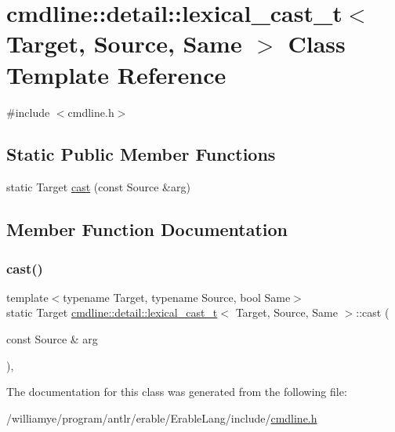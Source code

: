 \hypertarget{classcmdline_1_1detail_1_1lexical__cast__t}{}\section{cmdline\+::detail\+::lexical\+\_\+cast\+\_\+t$<$ Target, Source, Same $>$ Class Template Reference}
\label{classcmdline_1_1detail_1_1lexical__cast__t}


{\ttfamily \#include $<$cmdline.\+h$>$}

\subsection*{Static Public Member Functions}
\begin{DoxyCompactItemize}
\item 
static Target \mbox{\hyperlink{classcmdline_1_1detail_1_1lexical__cast__t_a533dd7d81255f684abba07d6c1545b1b}{cast}} (const Source \&arg)
\end{DoxyCompactItemize}


\subsection{Member Function Documentation}
\mbox{\label{classcmdline_1_1detail_1_1lexical__cast__t_a533dd7d81255f684abba07d6c1545b1b}} 
\subsubsection{\texorpdfstring{cast()}{cast()}}
{\footnotesize\ttfamily template$<$typename Target, typename Source, bool Same$>$ \\
static Target \mbox{\hyperlink{classcmdline_1_1detail_1_1lexical__cast__t}{cmdline\+::detail\+::lexical\+\_\+cast\+\_\+t}}$<$ Target, Source, Same $>$\+::cast (\begin{DoxyParamCaption}\item[{const Source \&}]{arg }\end{DoxyParamCaption})\hspace{0.3cm}{\ttfamily [inline]}, {\ttfamily [static]}}



The documentation for this class was generated from the following file\+:\begin{DoxyCompactItemize}
\item 
/williamye/program/antlr/erable/\+Erable\+Lang/include/\mbox{\hyperlink{cmdline_8h}{cmdline.\+h}}\end{DoxyCompactItemize}
